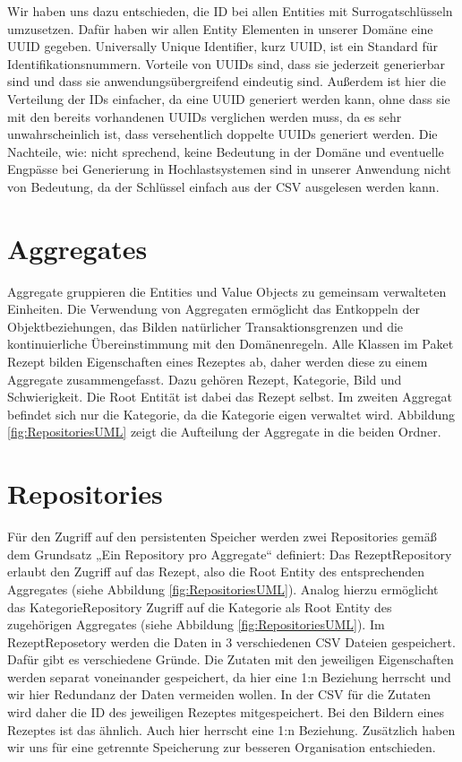 Wir haben uns dazu entschieden, die ID bei allen Entities mit Surrogatschlüsseln umzusetzen. Dafür haben wir allen Entity Elementen in unserer Domäne eine UUID gegeben. Universally Unique Identifier, kurz UUID, ist ein Standard für Identifikationsnummern. Vorteile von UUIDs sind, dass sie jederzeit generierbar sind und dass sie anwendungsübergreifend eindeutig sind. Außerdem ist hier die Verteilung der IDs einfacher, da eine UUID generiert werden kann, ohne dass sie mit den bereits vorhandenen UUIDs verglichen werden muss, da es sehr unwahrscheinlich ist, dass versehentlich doppelte UUIDs generiert werden. Die Nachteile, wie: nicht sprechend, keine Bedeutung in der Domäne und eventuelle Engpässe bei Generierung in
Hochlastsystemen sind in unserer Anwendung nicht von Bedeutung, da der Schlüssel einfach aus der CSV ausgelesen werden kann.

\section{Aggregates}
Aggregate gruppieren die Entities und Value Objects zu gemeinsam verwalteten Einheiten. Die Verwendung von Aggregaten ermöglicht das Entkoppeln der Objektbeziehungen, das Bilden natürlicher Transaktionsgrenzen und die kontinuierliche Übereinstimmung mit den Domänenregeln.
Alle Klassen im Paket Rezept bilden Eigenschaften eines Rezeptes ab, daher werden diese zu einem Aggregate zusammengefasst. Dazu gehören Rezept, Kategorie, Bild und Schwierigkeit. Die Root Entität ist dabei das Rezept selbst. Im zweiten Aggregat befindet sich nur die Kategorie, da die Kategorie eigen verwaltet wird. Abbildung \ref{fig:RepositoriesUML} zeigt die Aufteilung der Aggregate in die beiden Ordner. 

\section{Repositories}
Für den Zugriff auf den persistenten Speicher werden zwei Repositories gemäß dem Grundsatz „Ein Repository pro Aggregate“ definiert: Das RezeptRepository erlaubt den Zugriff auf das Rezept, also die Root Entity des entsprechenden Aggregates (siehe Abbildung \ref{fig:RepositoriesUML}). Analog hierzu ermöglicht das KategorieRepository Zugriff auf die Kategorie als Root Entity des zugehörigen Aggregates (siehe Abbildung \ref{fig:RepositoriesUML}). Im RezeptReposetory werden die Daten in 3 verschiedenen CSV Dateien gespeichert. Dafür gibt es verschiedene Gründe. Die Zutaten mit den jeweiligen Eigenschaften werden separat voneinander gespeichert, da hier eine 1:n Beziehung herrscht und wir hier Redundanz der Daten vermeiden wollen. In der CSV für die Zutaten wird daher die ID des jeweiligen Rezeptes mitgespeichert. Bei den Bildern eines Rezeptes ist das ähnlich. Auch hier herrscht eine 1:n Beziehung. Zusätzlich haben wir uns für eine getrennte Speicherung zur besseren Organisation entschieden. 

